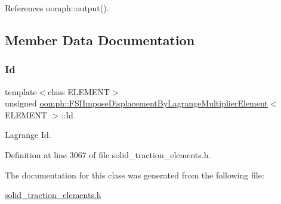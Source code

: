 References oomph\+::output().



\subsection{Member Data Documentation}
\mbox{\label{classoomph_1_1FSIImposeDisplacementByLagrangeMultiplierElement_ae9d988fbbe338d8ccc797428dc9c4674}} 
\subsubsection{\texorpdfstring{Id}{Id}}
{\footnotesize\ttfamily template$<$class E\+L\+E\+M\+E\+NT$>$ \\
unsigned \hyperlink{classoomph_1_1FSIImposeDisplacementByLagrangeMultiplierElement}{oomph\+::\+F\+S\+I\+Impose\+Displacement\+By\+Lagrange\+Multiplier\+Element}$<$ E\+L\+E\+M\+E\+NT $>$\+::Id\hspace{0.3cm}{\ttfamily [protected]}}



Lagrange Id. 



Definition at line 3067 of file solid\+\_\+traction\+\_\+elements.\+h.



The documentation for this class was generated from the following file\+:\begin{DoxyCompactItemize}
\item 
\hyperlink{solid__traction__elements_8h}{solid\+\_\+traction\+\_\+elements.\+h}\end{DoxyCompactItemize}
